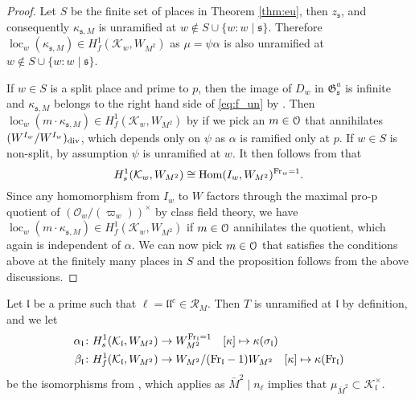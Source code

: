 \documentclass[leqno]{amsart}
\theoremstyle{definition}
\theoremstyle{remark}
\newcommand{\oo}{\mathcal{O}}
\newcommand{\eo}{\EuScript{O}}
\DeclareMathOperator{\Hom}{Hom}
\newcommand{\Fr}{\textnormal{Fr}} %
\newcommand{\fl}{\mathfrak{l}}
\newcommand{\fs}{\mathfrak{s}}
\newcommand{\K}{{\mathcal{K}}} %
\newcommand{\fG}{\mathfrak{G}}
\DeclareMathOperator{\loc}{loc}
\begin{document}
\begin{proof}

Let $S$ be the finite set of places in Theorem \ref{thm:eu},
then $z_\fs$, and consequently $\kappa_{\fs,M}$
is unramified at $w\notin S\cup\{w\colon w\mid\fs\}$.
Therefore $\loc_w(\kappa_{\fs, M})\in H^1_f(\K_w,W_{M^2})$
as $\mu=\psi\alpha$ is also unramified at 
$w\notin S\cup\{w\colon w\mid\fs\}$.


If $w\in S$ is a split place and prime to $p$,
then the image of $D_w$ in $\fG_{\fs}^a$
is infinite and $\kappa_{\fs, M}$
belongs to the right hand side of \eqref{eq:f_un}
by \cite[Cor 4.6.2]{Rubin}.
Then $\loc_w(m\cdot \kappa_{\fs, M})\in H^1_f(\K_w, W_{M^2})$
by \cite[Cor 4.6.5]{Rubin}
if we pick an $m\in \eo$ that annihilates
$(W^{I_w}/W^{I_w})_{\textnormal{div}}$,
which depends only on $\psi$
as $\alpha$ is ramified only at $p$.
If $w\in S$ is non-split,
by assumption $\psi$ is unramified at $w$.
It then follows from \cite[Lem 1.3.2(ii)]{Rubin} that
\[
    H^1_s(\K_w,W_{M^2})\cong \Hom(I_w, W_{M^2})^{\Fr_w=1}.
\]
Since any homomorphism from $I_w$ to $W$
factors through the maximal pro-p
quotient of $(\oo_w/(\varpi_w))^\times$ by class field theory,
we have $\loc_w(m\cdot \kappa_{\fs,M})\in
H^1_f(\K_w,W_{M^2})$
if $m\in \eo$ annihilates the quotient,
which again is independent of $\alpha$.
We can now pick $m\in \eo$
that satisfies the conditions above
at the finitely many places in $S$
and the proposition follows from the above discussions.




\end{proof}


Let $\fl$ be a prime such that $\ell=\fl\fl^c\in \mathcal{R}_M$.
Then $T$ is unramified at $\fl$ by definition, and we let
\begin{align}
\alpha_\fl&\colon
H^1_s(\K_\fl,W_{M^2})\to W_{M^2}^{\Fr_\fl=1}\quad
[\kappa]\mapsto \kappa(\sigma_\fl)
\label{eq:singular} \\
\beta_\fl&\colon 
H^1_f(\K_\fl,W_{M^2})\to W_{M^2}/(\Fr_\fl-1)W_{M^2}\quad
[\kappa]\mapsto \kappa(\Fr_\fl)
\label{eq:finite}
\end{align}
be the isomorphisms from \cite[Lem 1.4.7]{Rubin}, which applies 
as $\bar{M}^2\mid n_\ell$ implies that
$\mu_{\bar{M}^2}\subset \K_\fl^\times$.
\end{document}

